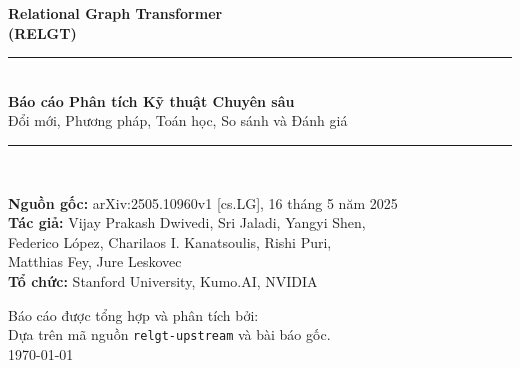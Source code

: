 \documentclass[12pt,a4paper]{article}
\begin{document}
\begin{titlepage}
\centering
\vspace*{1cm}
{\Huge\bfseries\color{blue!70!black} Relational Graph Transformer\\[0.4em]
\large\color{gray}(RELGT)}\\[1.5em]

\rule{\textwidth}{2pt}\\[0.5em]
{\large\bfseries Báo cáo Phân tích Kỹ thuật Chuyên sâu}\\[0.3em]
{\normalsize Đổi mới, Phương pháp, Toán học, So sánh và Đánh giá}
\rule{\textwidth}{1pt}\\[2em]

\begin{tcolorbox}[colback=gray!10, colframe=gray!50, width=0.9\textwidth]
\centering
\textbf{Nguồn gốc:} arXiv:2505.10960v1 [cs.LG], 16 tháng 5 năm 2025\\[0.3em]
\textbf{Tác giả:} Vijay Prakash Dwivedi, Sri Jaladi, Yangyi Shen,\\
Federico López, Charilaos I. Kanatsoulis, Rishi Puri,\\
Matthias Fey, Jure Leskovec\\[0.3em]
\textbf{Tổ chức:} Stanford University, Kumo.AI, NVIDIA
\end{tcolorbox}

\vspace{2em}

\vfill
{\small Báo cáo được tổng hợp và phân tích bởi:\\
Dựa trên mã nguồn \texttt{relgt-upstream} và bài báo gốc.\\[0.5em]
\today}
\end{titlepage}

\tableofcontents
\newpage
\end{document}
